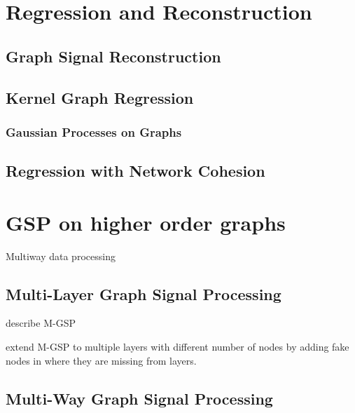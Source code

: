 \section{Regression and Reconstruction}


\subsection{Graph Signal Reconstruction}


\subsection{Kernel Graph Regression}

\subsubsection{Gaussian Processes on Graphs}


\subsection{Regression with Network Cohesion}


\section{GSP on higher order graphs}

Multiway data processing 

\cite{Smilde2004}
\cite{Kroonenberg2008}


\cite{Ji2019}

\cite{Cammoun2009}


\subsection{Multi-Layer Graph Signal Processing}

\cite{Zhang2022} describe M-GSP 

\cite{Zhang2018} extend M-GSP to multiple layers with different number of nodes by adding fake nodes in where they are missing from layers. 
 

\subsection{Multi-Way Graph Signal Processing}


